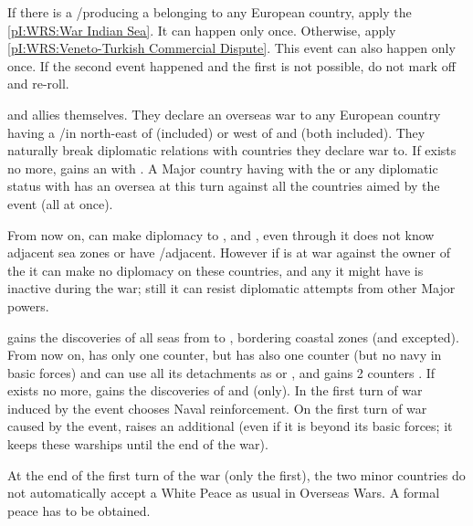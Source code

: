 \condition{}
\aparag If there is a \TP/\COL producing a \POSPICE belonging to any European
country, apply the \ref{pI:WRS:War Indian Sea}. It can happen only once.
\aparag Otherwise, apply \ref{pI:WRS:Veneto-Turkish Commercial Dispute}.  This
event can also happen only once.
\aparag If the second event happened and the first is not possible, do not
mark off and re-roll.



\phevnt
\aparag \paysEgypte and \paysGujerat allies themselves.  They declare an
overseas war to any European country having a \TP/\COL in \continentAfrica
north-east of \granderegionNatal (included) or \continentAsia west of
\granderegionMalaisie and \granderegionSumatra (both included). They naturally
break diplomatic relations with countries they declare war to.
\bparag If \paysEgypte exists no more, \TUR gains an \dipAT with \paysGujerat.
\aparag A Major country having  with the \paysGujerat or any
diplomatic status with \paysEgypte has an oversea \CB at this turn against all
the countries aimed by the event (all at once).

\phdipl
\aparag From now on, \VEN can make diplomacy to \paysAden, \paysOman and
\paysGujerat, even through it does not know adjacent sea zones or have
\TP/\COL adjacent. However if \VEN is at war against the owner of the
 it can make no diplomacy on these countries, and any
 it might have is inactive during the war; still it can resist
diplomatic attempts from other Major powers.

\phadm
\aparag \paysEgypte gains the discoveries of all seas from
 to , bordering coastal zones (and
 excepted). From now on, \paysEgypte has only one \ARMY
counter, but has also one \FLEET counter (but no navy in basic forces) and can
use all its detachments as \LD or \ND, and gains 2 counters \LDENDE.
\bparag If \paysEgypte exists no more, \TUR gains the discoveries of
 and  (only).
\aparag In the first turn of war induced by the event \paysEgypte chooses
Naval reinforcement.
\aparag On the first turn of war caused by the event, \paysGujerat raises an
additional \FLEET\facemoins (even if it is beyond its basic forces; it keeps
these warships until the end of the war).

\phpaix
\aparag At the end of the first turn of the war (only the first), the two
minor countries do not automatically accept a White Peace as usual in Overseas
Wars.  A formal peace has to be obtained.


